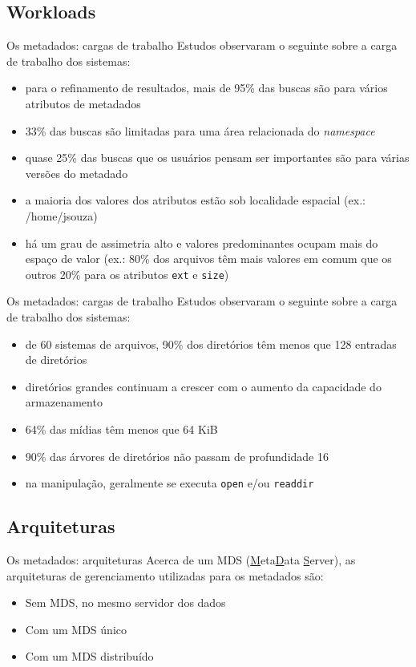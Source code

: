 \documentclass[xcolor=dvipsnames,table]{beamer}
\begin{document}
\subsection{Workloads}
\begin{frame}{Os metadados: cargas de trabalho}
	Estudos observaram o seguinte sobre a carga de trabalho dos sistemas:
	\begin{itemize}
		\item para o refinamento de resultados, mais de 95\% das buscas são para vários atributos de metadados
		\item 33\% das buscas são limitadas para uma área relacionada do \textit{namespace}
		\item quase 25\% das buscas que os usuários pensam ser importantes são para várias versões do metadado

		\pause

		\item a maioria dos valores dos atributos estão sob localidade espacial (ex.: /home/jsouza)
		\item há um grau de assimetria alto e valores predominantes ocupam mais do espaço de valor (ex.: 80\% dos arquivos têm mais valores em comum que os outros 20\% para os atributos \texttt{ext} e \texttt{size})
	\end{itemize}
\end{frame}

\begin{frame}{Os metadados: cargas de trabalho}
	Estudos observaram o seguinte sobre a carga de trabalho dos sistemas:
	\begin{itemize}
		\item de 60 sistemas de arquivos, 90\% dos diretórios têm menos que 128 entradas de diretórios
		\item diretórios grandes continuam a crescer com o aumento da capacidade do armazenamento
		\item 64\% das mídias têm menos que 64 KiB
		\item 90\% das árvores de diretórios não passam de profundidade 16
		\item na manipulação, geralmente se executa \texttt{open} e/ou \texttt{readdir}
	\end{itemize}
\end{frame}

\subsection{Arquiteturas}
\begin{frame}{Os metadados: arquiteturas}
	Acerca de um MDS (\underline{M}eta\underline{D}ata \underline{S}erver), as arquiteturas de gerenciamento utilizadas para os metadados são:
	\begin{itemize}
		\item Sem MDS, no mesmo servidor dos dados
		\item Com um MDS único
		\item Com um MDS distribuído
	\end{itemize}
\end{frame}
\end{document}
